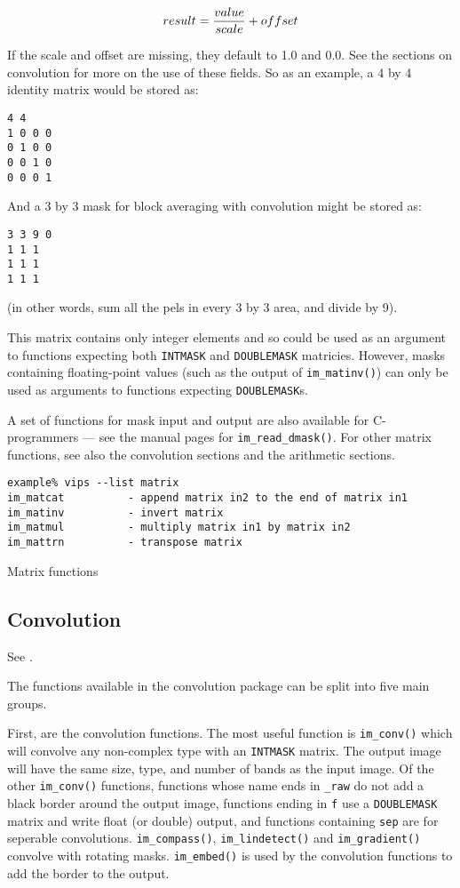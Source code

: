\[
result = {value \over scale} + offset
\]

If the scale and offset are missing, they default to 1.0 and 0.0.  See the
sections on convolution for more on the use of these fields. So as an example,
a 4 by 4 identity matrix would be stored as:

\begin{verbatim}
4 4 
1 0 0 0
0 1 0 0 
0 0 1 0
0 0 0 1
\end{verbatim}
  
And a 3 by 3 mask for block averaging with convolution might be stored as:

\begin{verbatim}
3 3 9 0
1 1 1
1 1 1 
1 1 1
\end{verbatim}
  
\noindent
(in other words, sum all the pels in every 3 by 3 area, and divide by 9).

This matrix contains only integer elements and so could be used as an
argument to functions expecting both \verb+INTMASK+ and \verb+DOUBLEMASK+
matricies. However, masks containing floating-point values (such as the
output of \verb+im_matinv()+) can only be used as arguments to functions
expecting \verb+DOUBLEMASK+s.

A set of functions for mask input and output are also available for
C-programmers --- see the manual pages for \verb+im_read_dmask()+. For
other matrix functions, see also the convolution sections and the arithmetic
sections.

\begin{fig2}
\begin{verbatim}
example% vips --list matrix
im_matcat          - append matrix in2 to the end of matrix in1
im_matinv          - invert matrix
im_matmul          - multiply matrix in1 by matrix in2
im_mattrn          - transpose matrix
\end{verbatim}
\caption{Matrix functions}
\label{fg:matricies}
\end{fig2}

\subsection{Convolution}

See .

The functions available in the convolution package can be split into five
main groups.

First, are the convolution functions. The most useful function is
\verb+im_conv()+ which will convolve any non-complex type with an
\verb+INTMASK+ matrix. The output image will have the same size, type, and
number of bands as the input image. Of the other \verb+im_conv()+ functions,
functions whose name ends in \verb+_raw+ do not add a black border around the
output image, functions ending in \verb+f+ use a \verb+DOUBLEMASK+ matrix
and write float (or double) output, and functions containing \verb+sep+
are for seperable convolutions.  \verb+im_compass()+, \verb+im_lindetect()+
and \verb+im_gradient()+ convolve with rotating masks.  \verb+im_embed()+
is used by the convolution functions to add the border to the output.

